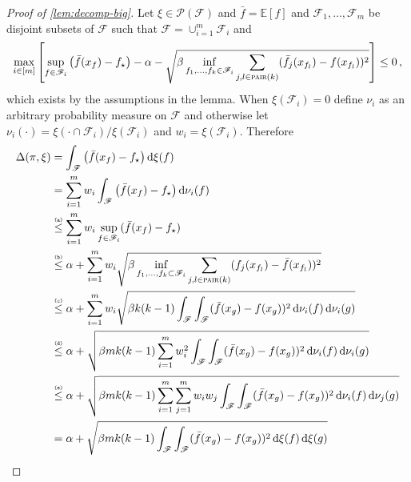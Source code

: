 \documentclass[letter, 12pt]{report}
\newcommand{\pair}{\operatorname{\textsc{pair}}}
\newcommand{\explan}[1]{\stackrel{\text{\tiny \texttt{#1}}}}
\newcommand{\E}{\mathbb E}
\newcommand{\sF}{\mathscr F}
\newcommand{\sP}{\mathscr P}
\renewcommand{\d}[1]{\operatorname{d}\!#1}
\newcommand{\1}{\mathbf{1}}
\theoremstyle{plain}
\theoremstyle{definition}
\theoremstyle{remark}
\begin{document}
\begin{proof}[Proof of \cref{lem:decomp-big}]
    Let $\xi \in \sP(\sF)$ and $\bar f = \E[f]$ and
    $\sF_1,\ldots,\sF_m$ be disjoint subsets of $\sF$ such that $\sF = \cup_{i=1}^m \sF_i$ and
    \begin{align}
        \max_{i \in [m]} \left[\sup_{f \in \sF_i} \left(\bar f(x_f) - f_\star\right) - \alpha - \sqrt{\beta \inf_{f_1,\ldots,f_k \in \sF_i} \sum_{j, l \in \pair(k)} (\bar f_j(x_{f_l}) - f(x_{f_l}))^2}\right] \leq 0 \,,
        \label{eq:decomp:1}
    \end{align}
    which exists by the assumptions in the lemma.
    When $\xi(\sF_i)=0$ define $\nu_i$ as an arbitrary probability measure on $\sF$ and otherwise let
    $\nu_i(\cdot) = \xi(\cdot \cap \sF_i) / \xi(\sF_i)$ and $w_i = \xi(\sF_i)$.
    Therefore
    \begin{align}
        \Delta(\pi, \xi)
         & = \int_\sF \left(\bar f(x_f) - f_\star\right) \d{\xi}(f) \nonumber                                                                                               \\
         & = \sum_{i=1}^m w_i \int_\sF \left(\bar f(x_f) - f_\star\right) \d{\nu_i}(f) \nonumber                                                                            \\
         & \explan{(a)}\leq \sum_{i=1}^m w_i \sup_{f \in \sF_i} (\bar f(x_f) - f_\star) \nonumber                                                                           \\
         & \explan{(b)}\leq \alpha + \sum_{i=1}^m w_i \sqrt{\beta \inf_{f_1,\ldots,f_k \subset \sF_i} \sum_{j,l \in \pair(k)} (f_j(x_{f_l}) - \bar f(x_{f_l}))^2} \nonumber \\
         & \explan{(c)}\leq \alpha + \sum_{i=1}^m w_i \sqrt{\beta k(k-1) \int_\sF \int_\sF (\bar f(x_g) - f(x_g))^2 \d{\nu_i}(f) \d{\nu_i}(g)} \nonumber                    \\
         & \explan{(d)}\leq \alpha + \sqrt{\beta m k(k-1) \sum_{i=1}^m w_i^2 \int_\sF \int_\sF (\bar f(x_g) - f(x_g))^2 \d{\nu_i}(f) \d{\nu_i}(g)} \nonumber                \\
         & \explan{(e)}\leq \alpha + \sqrt{\beta m k(k-1) \sum_{i=1}^m \sum_{j=1}^m w_i w_j \int_\sF \int_\sF (\bar f(x_g) - f(x_g))^2 \d{\nu_i}(f) \d{\nu_j}(g)} \nonumber \\
         & = \alpha + \sqrt{\beta m k(k-1) \int_\sF \int_\sF (\bar f(x_g) - f(x_g))^2 \d{\xi}(f) \d{\xi}(g)} \nonumber                                                      \\

\end{align}
\end{proof}
\end{document}
